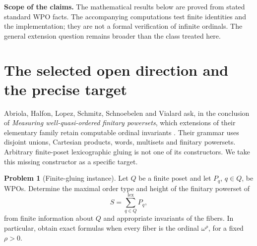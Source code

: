 \documentclass[11pt,a4paper]{article}
\theoremstyle{definition}
\newtheorem{problem}[theorem]{Problem}
\theoremstyle{remark}
\newcommand{\lxs}{\mathop{\sum}\limits^{\mathrm{lex}}}
\begin{document}
\begin{titlepage}
\begin{abstract}
\emph{Addition of 28 September 2026 (batch 36).} Parts~II and~III, merged
from four later manuscripts, determine the height for nonuniform fibres:
a coordinate is charged, by ordinary ordinal addition, only when its
vertex leaves the frontier.

\emph{Addition of 29 September 2026 (batch 42).} Part~IV shows, via uniquely
restricted matchings, that the height problem is NP-complete already for
height-two skeletons with every fibre $\omega$.
\end{abstract}
\vfill
\begin{resultbox}
\small\textbf{Scope of the claims.} The mathematical results below are proved
from stated standard WPO facts. The accompanying computations test finite
identities and the implementation; they are not a formal verification of
infinite ordinals. The general extension question remains broader than the
class treated here.
\end{resultbox}
\end{titlepage}
\hypersetup{pageanchor=true}
\setcounter{tocdepth}{1}
\hypersetup{bookmarksdepth=2}
\tableofcontents
\newpage
{}

\section{The selected open direction and the precise target}

Abriola, Halfon, Lopez, Schmitz, Schnoebelen and Vialard ask, in the conclusion
of \emph{Measuring well-quasi-ordered finitary powersets}, which extensions
of their elementary family retain computable ordinal invariants
\cite[Section 6, p.~23]{AbriolaEtAl2024}. Their grammar uses disjoint unions,
Cartesian products, words, multisets and finitary powersets. Arbitrary
finite-poset lexicographic gluing is not one of its constructors. We take
this missing constructor as a specific target.

\begin{problem}[Finite-gluing instance]\label{prob:target}
Let $Q$ be a finite poset and let $P_q$, $q\in Q$, be WPOs. Determine the
maximal order type and height of the finitary powerset of
\[
 S=\lxs_{q\in Q}P_q,
\]
from finite information about $Q$ and appropriate invariants of the fibers.
In particular, obtain exact formulas when every fiber is the ordinal
$\omega^\rho$, for a fixed $\rho>0$.
\end{problem}
\end{document}

